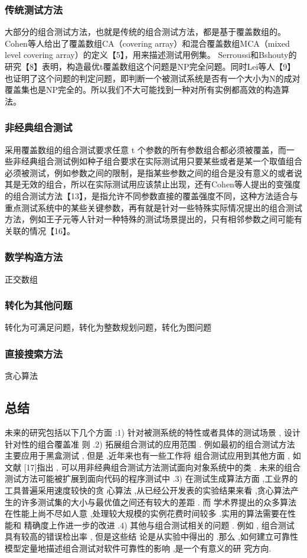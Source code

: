 \documentclass[10pt,journal,letterpaper,compsoc]{IEEEtran}
\begin{document}
\begin{CJK}{UTF8}{gkai}
    \subsubsection{传统测试方法}
大部分的组合测试方法，也就是传统的组合测试方法，都是基于覆盖数组的。Cohen等人给出了覆盖数组CA（covering array）和混合覆盖数组MCA（mixed level covering array）的定义【5】，用来描述测试用例集。
Serroussi和Bshouty的研究【8】表明，构造最优t覆盖数组这个问题是NP完全问题。同时Lei等人【9】也证明了这个问题的判定问题，即判断一个被测试系统是否有一个大小为N的成对覆盖集也是NP完全的。所以我们不大可能找到一种对所有实例都高效的构造算法。

    \subsubsection{非经典组合测试}
采用覆盖数组的组合测试要求任意 t 个参数的所有参数组合都必须被覆盖，而一些非经典组合测试例如种子组合要求在实际测试用只要某些或者是某一个取值组合必须被测试，例如参数之间的限制，是指某些参数之间的组合是没有意义的或者说其是无效的组合，所以在实际测试用应该禁止出现，还有Cohen等人提出的变强度的组合测试方法【13】，是指允许不同参数直接的覆盖强度不同，这种方法适合与重点测试系统中的某些关键参数，再有就是针对一些特殊实际情况提出的组合测试方法，例如王子元等人针对一种特殊的测试场景提出的，只有相邻参数之间可能有关联的情况【16】。
    \subsubsection{数学构造方法}
正交数组
    \subsubsection{转化为其他问题}
转化为可满足问题，转化为整数规划问题，转化为图问题
    \subsubsection{直接搜索方法}
贪心算法
\subsection{总结}
未来的研究包括以下几个方面 :1) 针对被测系统的特性或者具体的测试场景 , 设计针对性的组合覆盖准
则 .2) 拓展组合测试的应用范围 . 例如最初的组合测试方法主要应用于黑盒测试 , 但是 ,近年来也有一些工作将
组合测试应用到其他方面 , 如文献 [17]指出 , 可以用非经典组合测试方法测试面向对象系统中的类 . 未来的组合
测试方法可能被扩展到面向代码的程序测试中 .3) 在测试生成算法方面 ,工业界的工具普遍采用速度较快的贪
心算法 ,从已经公开发表的实验结果来看 ,贪心算法产生的许多测试集的大小与最优值之间还有较大的差距 . 而
学术界提出的众多算法在性能上尚不尽如人意 ,处理较大规模的实例花费时间较多 .实用的算法需要在性能和
精确度上作进一步的改进 .4) 其他与组合测试相关的问题 . 例如 , 组合测试具有较高的错误检出率 , 但是这些结
论是从实验中得出的 .那么 ,如何建立可靠性模型定量地描述组合测试对软件可靠性的影响 ,是一个有意义的研
究方向.

\end{CJK}
\end{document}

